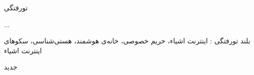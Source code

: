 ‌تورفتگی

...

‌بلند
‌تورفتگی : اینترنت اشیاء، حریم خصوصی، خانه‌ی هوشمند، هستی‌شناسی، سکوهای اینترنت اشیاء 

‌جدید